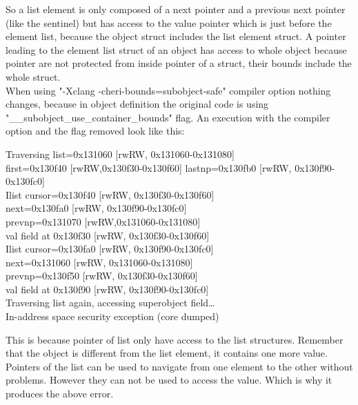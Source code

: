 \documentclass[a4paper, 11pt]{article}
\begin{document}
So a list element is only composed of a next pointer and a previous next pointer (like the sentinel) but has access to the value pointer which is just before the element list, because the object struct includes the list element struct. A pointer leading to the element list struct of an object has access to whole object because pointer are not protected from inside pointer of a struct, their bounds include the whole struct.\\

When using "-Xclang -cheri-bounds=subobject-safe" compiler option nothing changes, because in object definition the original code is using "\_\_subobject\_use\_container\_bounds" flag.
An execution with the compiler option and the flag removed look like this:
\begin{tcolorbox}[colback=gray!5!white, colframe=blue!75!black, title=Output On an environment protected by CHERI \& Subobject protection]
	Traversing list=0x131060 [rwRW, 0x131060-0x131080] \\
	first=0x130f40 [rwRW,0x130f30-0x130f60] lastnp=0x130fb0 [rwRW, 0x130f90-0x130fc0]\\
	Ilist cursor=0x130f40 [rwRW, 0x130f30-0x130f60]\\
	next=0x130fa0 [rwRW, 0x130f90-0x130fc0]\\
	prevnp=0x131070 [rwRW,0x131060-0x131080]\\
	val field at 0x130f30 [rwRW, 0x130f30-0x130f60]\\
	Ilist cursor=0x130fa0 [rwRW, 0x130f90-0x130fc0]\\
	next=0x131060 [rwRW, 0x131060-0x131080]\\
	prevnp=0x130f50 [rwRW, 0x130f30-0x130f60]\\
	val field at 0x130f90 [rwRW, 0x130f90-0x130fc0]\\
	Traversing list again, accessing superobject field\dots\\
	In-address space security exception (core dumped)
\end{tcolorbox}

This is because pointer of list only have access to the list structures. Remember that the object is different from the list element, it contains one more value. Pointers of the list can be used to navigate from one element to the other without problems. However they can not be used to access the value. 
Which is why it produces the above error.
\end{document}
